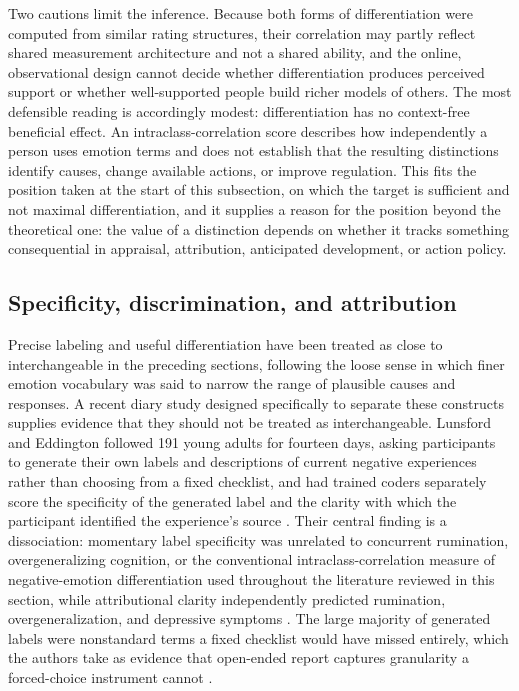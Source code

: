 \documentclass[11pt]{article}
\begin{document}
Two cautions limit the inference. Because both forms of differentiation were computed from similar rating structures, their correlation may partly reflect shared measurement architecture and not a shared ability, and the online, observational design cannot decide whether differentiation produces perceived support or whether well-supported people build richer models of others. The most defensible reading is accordingly modest: differentiation has no context-free beneficial effect. An intraclass-correlation score describes how independently a person uses emotion terms and does not establish that the resulting distinctions identify causes, change available actions, or improve regulation. This fits the position taken at the start of this subsection, on which the target is sufficient and not maximal differentiation, and it supplies a reason for the position beyond the theoretical one: the value of a distinction depends on whether it tracks something consequential in appraisal, attribution, anticipated development, or action policy.

\subsection{Specificity, discrimination, and attribution}\label{sub:specificity}

Precise labeling and useful differentiation have been treated as close to interchangeable in the preceding sections, following the loose sense in which finer emotion vocabulary was said to narrow the range of plausible causes and responses. A recent diary study designed specifically to separate these constructs supplies evidence that they should not be treated as interchangeable. Lunsford and Eddington followed 191 young adults for fourteen days, asking participants to generate their own labels and descriptions of current negative experiences rather than choosing from a fixed checklist, and had trained coders separately score the specificity of the generated label and the clarity with which the participant identified the experience's source \citep{LunsfordEddington2026}. Their central finding is a dissociation: momentary label specificity was unrelated to concurrent rumination, overgeneralizing cognition, or the conventional intraclass-correlation measure of negative-emotion differentiation used throughout the literature reviewed in this section, while attributional clarity independently predicted rumination, overgeneralization, and depressive symptoms \citep{LunsfordEddington2026}. The large majority of generated labels were nonstandard terms a fixed checklist would have missed entirely, which the authors take as evidence that open-ended report captures granularity a forced-choice instrument cannot \citep{LunsfordEddington2026}.
\end{document}
